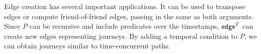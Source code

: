 Edge creation has several important applications.  It can be used to
transpose \tg edges or compute friend-of-friend edges, passing in the
same \tg as both arguments.  Since $P$ can be recursive and include
predicates over the timestamps, $\textsf{edge}^T$ can create new edges
representing journeys.  By adding a temporal
condition to $P$, we can obtain journeys similar to time-concurrent
paths.



